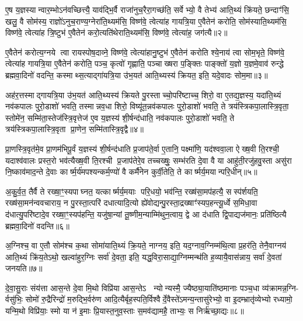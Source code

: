 ए॒ष य॒ज्ञस्यान्वार॒म्भोऽन॑वच्छित्त्यै॒ याव॑द्भि॒र्वै राजा॑नुच॒रैरा॒गच्छ॑ति॒ सर्वेभ्यो॒ वै तेभ्य॑ आति॒थ्यं क्रि॑यते॒ छन्दाꣳ॑सि॒ खलु॒ वै सोम॑स्य॒ राज्ञो॑ऽनुच॒राण्य॒ग्नेरा॑ति॒थ्यम॑सि॒ विष्ण॑वे॒ त्वेत्या॑ह गायत्रि॒या ए॒वैतेन॑ करोति॒ सोम॑स्याति॒थ्यम॑सि॒ विष्ण॑वे॒ त्वेत्या॑ह त्रि॒ष्टुभ॑ ए॒वैतेन॑ करो॒त्यति॑थेराति॒थ्यम॑सि॒ विष्ण॑वे॒ त्वेत्या॑ह॒ जग॑त्यै॥२॥

ए॒वैतेन॑ करोत्य॒ग्नये त्वा रायस्पोष॒दाव्ने॒ विष्ण॑वे॒ त्वेत्या॑हानु॒ष्टुभ॑ ए॒वैतेन॑ करोति श्ये॒नाय॑ त्वा सोम॒भृते॒ विष्ण॑वे॒ त्वेत्या॑ह गायत्रि॒या ए॒वैतेन॑ करोति॒ पञ्च॒ कृत्वो॑ गृह्णाति॒ पञ्चाख्षरा प॒ङ्क्तिः पाङ्क्तो॑ य॒ज्ञो य॒ज्ञमे॒वाव॑ रुन्द्धे ब्रह्मवा॒दिनो॑ वदन्ति॒ कस्माथ्स॒त्याद्गा॑यत्रि॒या उ॑भ॒यत॑ आति॒थ्यस्य॑ क्रियत॒ इति॒ यदे॒वादः सोम॒मा॥३॥

अह॑र॒त्तस्माद्गायत्रि॒या उ॑भ॒यत॑ आति॒थ्यस्य॑ क्रियते पु॒रस्ताच्चो॒परि॑ष्टाच्च॒ शिरो॒ वा ए॒तद्य॒ज्ञस्य॒ यदा॑ति॒थ्यं नव॑कपालः पुरो॒डाशो॑ भवति॒ तस्मान्नव॒धा शिरो॒ विष्यू॑त॒न्नव॑कपालः पुरो॒डाशो॑ भवति॒ ते त्रय॑स्त्रिकपा॒लास्त्रि॒वृता॒ स्तोमे॑न॒ सम्मि॑ता॒स्तेज॑स्त्रि॒वृत्तेज॑ ए॒व य॒ज्ञस्य॑ शी॒र्\mbox{}षन्द॑धाति॒ नव॑कपालः पुरो॒डाशो॑ भवति॒ ते त्रय॑स्त्रिकपा॒लास्त्रि॒वृता प्रा॒णेन॒ सम्मि॑तास्त्रि॒वृद्वै॥४॥

प्रा॒णस्त्रि॒वृत॑मे॒व प्रा॒णम॑भिपू॒र्वं य॒ज्ञस्य॑ शी॒र्\mbox{}षन्द॑धाति प्र॒जाप॑ते॒र्वा ए॒तानि॒ पक्ष्मा॑णि॒ यद॑श्ववा॒ला ऐख्ष॒वी ति॒रश्ची॒ यदाश्व॑वालः प्रस्त॒रो भव॑त्यैख्ष॒वी ति॒रश्ची प्र॒जाप॑तेरे॒व तच्चख्षुः॒ सम्भ॑रति दे॒वा वै या आहु॑ती॒रजु॑हवु॒स्ता असु॑रा नि॒ष्काव॑माद॒न्ते दे॒वाः कार्\mbox{}ष्म॒र्य॑मपश्यन्कर्म॒ण्यो॑ वै कर्मै॑नेन कुर्वी॒तेति॒ ते कार्ष्मर्य॒मयान्परि॒धीन्॥५॥

अ॒कु॒र्व॒त॒ तैर्वै ते रख्षा॒ꣳ॒स्यपाघ्नत॒ यत्कार्ष्मर्य॒मयाः परि॒धयो॒ भव॑न्ति॒ रख्ष॑सा॒मप॑हत्यै॒ सस्प॑र्शयति॒ रख्ष॑सा॒मन॑न्ववचाराय॒ न पु॒रस्ता॒त्परि॑ दधात्यादि॒त्यो ह्ये॑वोद्यन्पु॒रस्ता॒द्रख्षाꣳ॑स्यप॒हन्त्यू॒र्ध्वे स॒मिधा॒वा द॑धात्यु॒परि॑ष्टादे॒व रख्षा॒ꣳ॒स्यप॑हन्ति॒ यजु॑षा॒न्यां तू॒ष्णीम॒न्याम्मि॑थुन॒त्वाय॒ द्वे आ द॑धाति द्वि॒पाद्यज॑मानः॒ प्रति॑ष्ठित्यै ब्रह्मवा॒दिनो॑ वदन्ति॥६॥

अ॒ग्निश्च॒ वा ए॒तौ सोम॑श्च क॒था सोमा॑याति॒थ्यं क्रि॒यते॒ नाग्नय॒ इति॒ यद॒ग्नाव॒ग्निम्म॑थि॒त्वा प्र॒हर॑ति॒ तेनै॒वाग्नय॑ आति॒थ्यं क्रि॑य॒तेऽथो॒ खल्वा॑हुर॒ग्निः सर्वा॑ दे॒वता॒ इति॒ यद्ध॒विरा॒साद्या॒ग्निम्मन्थ॑ति ह॒व्यायै॒वास॑न्नाय॒ सर्वा॑ दे॒वता॑ जनयति॥७॥

{\anuvakamend[{पत्नि॑या ए॒व जग॑त्या॒ आ त्रि॒वृद्वै प॑रि॒धीन् व॑द॒न्त्येक॑चत्वारिशच्च॥१॥}]}

दे॒वा॒सु॒राः संय॑त्ता आस॒न्ते दे॒वा मि॒थो विप्रि॑या आस॒न्तेऽ  न्योन्यस्मै॒ ज्यैष्ठ्या॒याति॑ष्ठमानाः पञ्च॒धा व्य॑क्रामन्न॒ग्नि- र्वसु॑भिः॒ सोमो॑ रु॒द्रैरिन्द्रो॑ म॒रुद्भि॒र्वरु॑ण आदि॒त्यैर्बृह॒स्पति॒र्विश्वैर्दे॒वैस्ते॑ऽमन्य॒न्तासु॑रेभ्यो॒ वा इ॒दम्भ्रातृ॑व्येभ्यो रध्यामो॒ यन्मि॒थो विप्रि॑याः॒ स्मो या न॑ इ॒माः प्रि॒यास्त॒नुव॒स्ताः स॒मव॑द्यामहै॒ ताभ्यः॒ स निर्\mbox{}ऋ॑च्छा॒द्यः॥८॥

